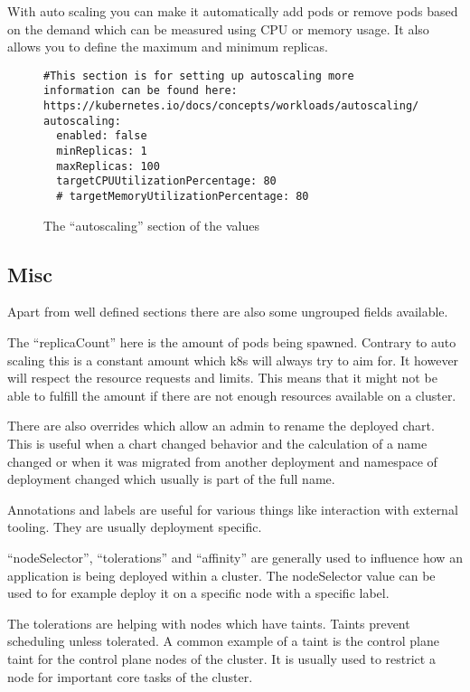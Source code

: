 With auto scaling you can make it automatically add pods or remove pods based on the demand which can be measured using CPU or memory usage.
It also allows you to define the maximum and minimum replicas.

\begin{figure}[h]
\begin{verbatim}
#This section is for setting up autoscaling more information can be found here: https://kubernetes.io/docs/concepts/workloads/autoscaling/
autoscaling:
  enabled: false
  minReplicas: 1
  maxReplicas: 100
  targetCPUUtilizationPercentage: 80
  # targetMemoryUtilizationPercentage: 80
\end{verbatim}
\caption{The \enquote{autoscaling} section of the \gls{values}}\label{code:autoscaling_section}
\end{figure}

\subsection{Misc}
Apart from well defined sections there are also some ungrouped fields available.

The \enquote{replicaCount} here is the amount of pods being spawned.
Contrary to auto scaling this is a constant amount which \gls{k8s} will always try to aim for.
It however will respect the resource requests and limits.
This means that it might not be able to fulfill the amount if there are not enough resources available on a cluster.

\bigskip
There are also overrides which allow an admin to rename the deployed chart.
This is useful when a chart changed behavior and the calculation of a name changed or when it was migrated from another deployment and namespace of deployment changed which usually is part of the full name.

\bigskip
Annotations and labels are useful for various things like interaction with external tooling.
They are usually deployment specific.

\bigskip

\enquote{nodeSelector}, \enquote{tolerations} and \enquote{affinity} are generally used to influence how an application is being deployed within a cluster.
The nodeSelector value can be used to for example deploy it on a specific node with a specific label.

The tolerations are helping with nodes which have taints.
Taints prevent scheduling unless tolerated.
A common example of a taint is the control plane taint for the control plane nodes of the cluster.
It is usually used to restrict a node for important core tasks of the cluster.

